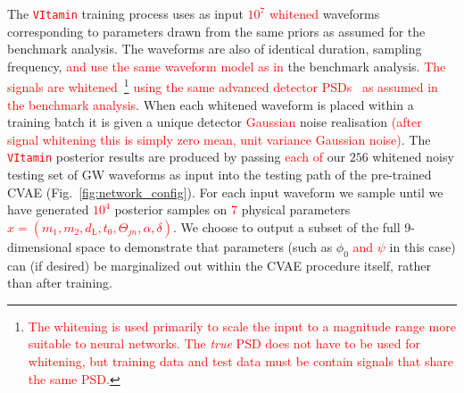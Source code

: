 \documentclass[%
showpacs,
nofootinbib,
 amsmath,amssymb,
 aps,
 twocolumn,
 prl,
 reprint,
floatfix,
]{revtex4-1}
\newcommand{\new}[1]{\textcolor{red}{#1}}
\begin{document}
%
%
The \new{\texttt{VItamin}} training process uses as input \new{$10^{7}$} \new{whitened}
waveforms corresponding to parameters drawn from the same priors as assumed for
the benchmark analysis. The waveforms are also of identical duration, sampling
frequency, \new{and use the same waveform model as in} the benchmark analysis.
\new{The signals are whitened}~\footnote{\new{The whitening is used primarily to
scale the input to a magnitude range more suitable to neural networks. The
\emph{true} \ac{PSD} does not have to be used for whitening, but training data
and test data must be contain signals that share the same \ac{PSD}.}}
\new{using the same advanced detector \acp{PSD}~\cite{aligo_noisecurves} as
assumed in the benchmark analysis}. When each whitened waveform is placed
within a training batch it is given a unique detector \new{Gaussian} noise
realisation \new{(after signal whitening this is simply zero mean, unit
variance Gaussian noise)}. The \new{\texttt{VItamin}} posterior results are produced by
passing \new{each of} our $256$ whitened noisy testing set of \ac{GW} waveforms
as input into the testing path of the pre-trained
\ac{CVAE} (Fig.~\ref{fig:network_config}). For each input waveform we sample until we
have generated \new{$10^4$} posterior samples on \new{7} physical parameters
\new{$x=(m_1,m_2,d_{\text{L}},t_{0},\Theta_{jn},\alpha,\delta)$}. We choose to
output a subset of the full 9-dimensional space to demonstrate that parameters
(such as $\phi_0$ \new{and $\psi$} in this case) can (if desired) be
marginalized out within the \ac{CVAE} procedure itself, rather than after
training. 
\end{document}
